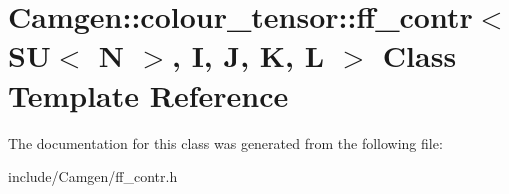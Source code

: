 \hypertarget{a00227}{}\section{Camgen\+:\+:colour\+\_\+tensor\+:\+:ff\+\_\+contr$<$ S\+U$<$ N $>$, I, J, K, L $>$ Class Template Reference}
\label{a00227}


The documentation for this class was generated from the following file\+:\begin{DoxyCompactItemize}
\item 
include/\+Camgen/ff\+\_\+contr.\+h\end{DoxyCompactItemize}
